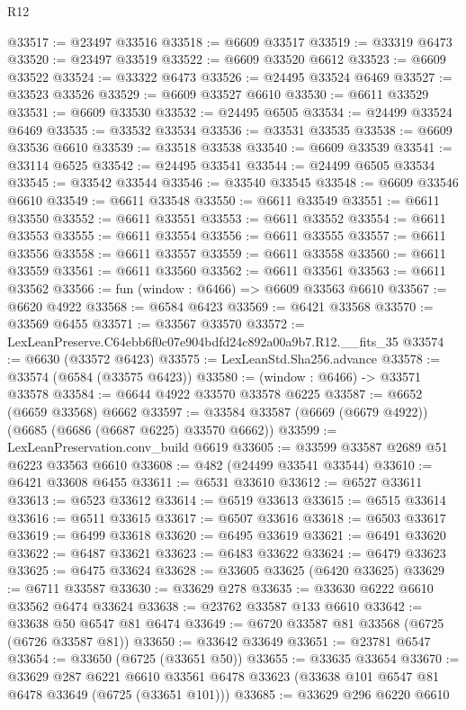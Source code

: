 \begin{lexlean}{R12}
\begin{coremodule}
@33517 := @23497 @33516
@33518 := @6609 @33517
@33519 := @33319 @6473
@33520 := @23497 @33519
@33522 := @6609 @33520 @6612
@33523 := @6609 @33522
@33524 := @33322 @6473
@33526 := @24495 @33524 @6469
@33527 := @33523 @33526
@33529 := @6609 @33527 @6610
@33530 := @6611 @33529
@33531 := @6609 @33530
@33532 := @24495 @6505
@33534 := @24499 @33524 @6469
@33535 := @33532 @33534
@33536 := @33531 @33535
@33538 := @6609 @33536 @6610
@33539 := @33518 @33538
@33540 := @6609 @33539
@33541 := @33114 @6525
@33542 := @24495 @33541
@33544 := @24499 @6505 @33534
@33545 := @33542 @33544
@33546 := @33540 @33545
@33548 := @6609 @33546 @6610
@33549 := @6611 @33548
@33550 := @6611 @33549
@33551 := @6611 @33550
@33552 := @6611 @33551
@33553 := @6611 @33552
@33554 := @6611 @33553
@33555 := @6611 @33554
@33556 := @6611 @33555
@33557 := @6611 @33556
@33558 := @6611 @33557
@33559 := @6611 @33558
@33560 := @6611 @33559
@33561 := @6611 @33560
@33562 := @6611 @33561
@33563 := @6611 @33562
@33566 := fun (window : @6466) => @6609 @33563 @6610
@33567 := @6620 @4922
@33568 := @6584 @6423
@33569 := @6421 @33568
@33570 := @33569 @6455
@33571 := @33567 @33570
@33572 := LexLeanPreserve.C64ebb6f0c07e904bdfd24c892a00a9b7.R12.__fits_35
@33574 := @6630 (@33572 @6423)
@33575 := LexLeanStd.Sha256.advance
@33578 := @33574 (@6584 (@33575 @6423))
@33580 := (window : @6466) -> @33571 @33578
@33584 := @6644 @4922 @33570 @33578 @6225
@33587 := @6652 (@6659 @33568) @6662
@33597 := @33584 @33587 (@6669 (@6679 @4922)) (@6685 (@6686 (@6687 @6225) @33570 @6662))
@33599 := LexLeanPreservation.conv_build @6619
@33605 := @33599 @33587 @2689 @51 @6223 @33563 @6610
@33608 := @482 (@24499 @33541 @33544)
@33610 := @6421 @33608 @6455
@33611 := @6531 @33610
@33612 := @6527 @33611
@33613 := @6523 @33612
@33614 := @6519 @33613
@33615 := @6515 @33614
@33616 := @6511 @33615
@33617 := @6507 @33616
@33618 := @6503 @33617
@33619 := @6499 @33618
@33620 := @6495 @33619
@33621 := @6491 @33620
@33622 := @6487 @33621
@33623 := @6483 @33622
@33624 := @6479 @33623
@33625 := @6475 @33624
@33628 := @33605 @33625 (@6420 @33625)
@33629 := @6711 @33587
@33630 := @33629 @278
@33635 := @33630 @6222 @6610 @33562 @6474 @33624
@33638 := @23762 @33587 @133 @6610
@33642 := @33638 @50 @6547 @81 @6474
@33649 := @6720 @33587 @81 @33568 (@6725 (@6726 @33587 @81))
@33650 := @33642 @33649
@33651 := @23781 @6547
@33654 := @33650 (@6725 (@33651 @50))
@33655 := @33635 @33654
@33670 := @33629
    @287
    @6221
    @6610
    @33561
    @6478
    @33623
    (@33638 @101 @6547 @81 @6478 @33649 (@6725 (@33651 @101)))
@33685 := @33629
    @296
    @6220
    @6610

\end{coremodule}
\end{lexlean}
